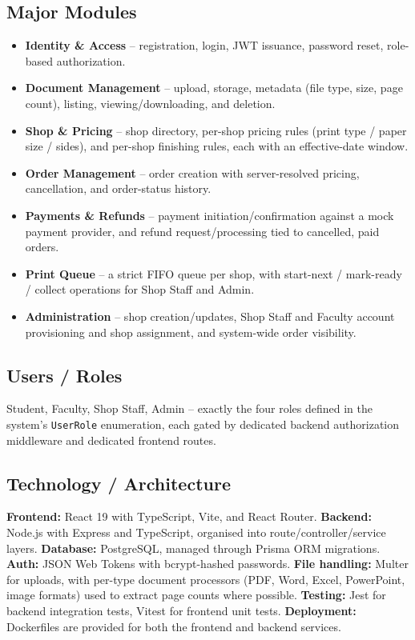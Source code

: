 \documentclass[12pt,a4paper]{report}
\begin{document}
\subsection*{Major Modules}
\begin{itemize}[leftmargin=0.7cm]
  \item \textbf{Identity \& Access} -- registration, login, JWT issuance, password reset, role-based authorization.
  \item \textbf{Document Management} -- upload, storage, metadata (file type, size, page count), listing, viewing/downloading, and deletion.
  \item \textbf{Shop \& Pricing} -- shop directory, per-shop pricing rules (print type / paper size / sides), and per-shop finishing rules, each with an effective-date window.
  \item \textbf{Order Management} -- order creation with server-resolved pricing, cancellation, and order-status history.
  \item \textbf{Payments \& Refunds} -- payment initiation/confirmation against a mock payment provider, and refund request/processing tied to cancelled, paid orders.
  \item \textbf{Print Queue} -- a strict FIFO queue per shop, with start-next / mark-ready / collect operations for Shop Staff and Admin.
  \item \textbf{Administration} -- shop creation/updates, Shop Staff and Faculty account provisioning and shop assignment, and system-wide order visibility.
\end{itemize}

\subsection*{Users / Roles}
Student, Faculty, Shop Staff, Admin -- exactly the four roles defined in the system's \texttt{UserRole} enumeration, each gated by dedicated backend authorization middleware and dedicated frontend routes.

\subsection*{Technology / Architecture}
\textbf{Frontend:} React 19 with TypeScript, Vite, and React Router. \textbf{Backend:} Node.js with Express and TypeScript, organised into route/controller/service layers. \textbf{Database:} PostgreSQL, managed through Prisma ORM migrations. \textbf{Auth:} JSON Web Tokens with bcrypt-hashed passwords. \textbf{File handling:} Multer for uploads, with per-type document processors (PDF, Word, Excel, PowerPoint, image formats) used to extract page counts where possible. \textbf{Testing:} Jest for backend integration tests, Vitest for frontend unit tests. \textbf{Deployment:} Dockerfiles are provided for both the frontend and backend services.
\end{document}
